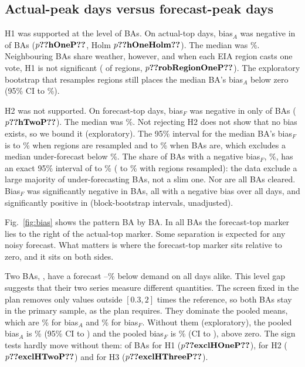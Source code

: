 \documentclass[conference,a4paper]{IEEEtran}
\begin{document}
\subsection{Actual-peak days versus forecast-peak days}
H1 was supported at the level of BAs. On actual-top days, bias$_A$ was negative in  of  BAs ($p\res{hOneP}$, Holm $p\res{hOneHolm}$). The median was \%. Neighbouring BAs share weather, however, and when each EIA region casts one vote, H1 is not significant ( of  regions, $p\res{robRegionOneP}$). The exploratory bootstrap that resamples regions still places the median BA's bias$_A$ below zero (95\% CI  to \%).

H2 was not supported. On forecast-top days, bias$_F$ was negative in only  of  BAs ($p\res{hTwoP}$). The median was \%. Not rejecting H2 does not show that no bias exists, so we bound it (exploratory). The 95\% interval for the median BA's bias$_F$ is  to \% when regions are resampled and  to \% when BAs are, which excludes a median under-forecast below \%. The share of BAs with a negative bias$_F$, \%, has an exact 95\% interval of  to \% ( to \% with regions resampled): the data exclude a large majority of under-forecasting BAs, not a slim one. Nor are all BAs cleared. Bias$_F$ was significantly negative in  BAs, all with a negative bias over all days, and significantly positive in  (block-bootstrap intervals, unadjusted).

Fig.~\ref{fig:bias} shows the pattern BA by BA. In all  BAs the forecast-top marker lies to the right of the actual-top marker. Some separation is expected for any noisy forecast. What matters is where the forecast-top marker sits relative to zero, and it sits on both sides.

Two BAs, , have a forecast --\% below demand on all days alike. This level gap suggests that their two series measure different quantities. The screen fixed in the plan removes only values outside $[0.3, 2]$ times the reference, so both BAs stay in the primary sample, as the plan requires. They dominate the pooled means, which are \% for bias$_A$ and \% for bias$_F$. Without them (exploratory), the pooled bias$_A$ is \% (95\% CI  to ) and the pooled bias$_F$ is \% (CI  to ), above zero. The sign tests hardly move without them:  of  BAs for H1 ($p\res{exclHOneP}$),  for H2 ($p\res{exclHTwoP}$) and  for H3 ($p\res{exclHThreeP}$).
\end{document}
